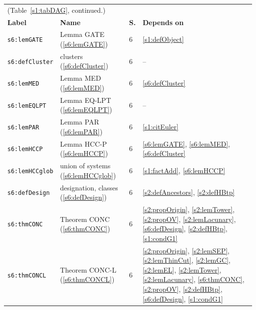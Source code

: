 \begin{center}
{\footnotesize
\setlength{\tabcolsep}{3pt}
\begin{tabular}{p{3.2cm}p{3.6cm}p{0.5cm}p{7.6cm}}
\multicolumn{4}{l}{(Table~\ref{s1:tabDAG}, continued.)}\\
\textbf{Label} & \textbf{Name} & \textbf{S.} & \textbf{Depends on}\\
\hline
\texttt{s6:lemGATE} & Lemma GATE (\ref{s6:lemGATE}) & 6 & \ref{s1:defObject}\\
\texttt{s6:defCluster} & clusters (\ref{s6:defCluster}) & 6 & --\\
\texttt{s6:lemMED} & Lemma MED (\ref{s6:lemMED}) & 6 & \ref{s6:defCluster}\\
\texttt{s6:lemEQLPT} & Lemma EQ-LPT (\ref{s6:lemEQLPT}) & 6 & --\\
\texttt{s6:lemPAR} & Lemma PAR (\ref{s6:lemPAR}) & 6 & \ref{s1:citEuler}\\
\texttt{s6:lemHCCP} & Lemma HCC-P (\ref{s6:lemHCCP}) & 6 & \ref{s6:lemGATE}, \ref{s6:lemMED}, \ref{s6:defCluster}\\
\texttt{s6:lemHCCglob} & union of systems (\ref{s6:lemHCCglob}) & 6 & \ref{s1:factAdd}, \ref{s6:lemHCCP}\\
\texttt{s6:defDesign} & designation, classes (\ref{s6:defDesign}) & 6 & \ref{s2:defAncestors}, \ref{s2:defHBtp}\\
\texttt{s6:thmCONC} & Theorem CONC (\ref{s6:thmCONC}) & 6 & \ref{s2:propOrigin}, \ref{s2:lemTower}, \ref{s2:propOV}, \ref{s2:lemLacunary}, \ref{s6:defDesign}, \ref{s2:defHBtp}, \ref{s1:condG1}\\
\texttt{s6:thmCONCL} & Theorem CONC-L (\ref{s6:thmCONCL}) & 6 & \ref{s2:propOrigin}, \ref{s2:lemSEP}, \ref{s2:lemThinCut}, \ref{s2:lemGC}, \ref{s2:lemEL}, \ref{s2:lemTower}, \ref{s2:lemLacunary}, \ref{s6:thmCONC}, \ref{s2:propOV}, \ref{s2:defHBtp}, \ref{s6:defDesign}, \ref{s1:condG1}\\
\hline
\end{tabular}}
\end{center}

